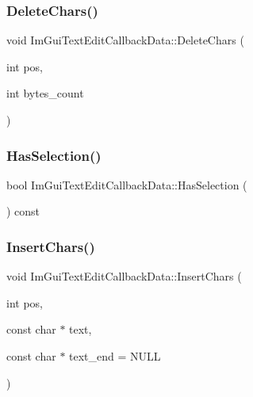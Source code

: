 \subsubsection{\texorpdfstring{Delete\+Chars()}{DeleteChars()}}
{\footnotesize\ttfamily void Im\+Gui\+Text\+Edit\+Callback\+Data\+::\+Delete\+Chars (\begin{DoxyParamCaption}\item[{int}]{pos,  }\item[{int}]{bytes\+\_\+count }\end{DoxyParamCaption})}

\hypertarget{struct_im_gui_text_edit_callback_data_ac43cc964e6c1c829db3fdb71660ff604}{}\label{struct_im_gui_text_edit_callback_data_ac43cc964e6c1c829db3fdb71660ff604} 
\subsubsection{\texorpdfstring{Has\+Selection()}{HasSelection()}}
{\footnotesize\ttfamily bool Im\+Gui\+Text\+Edit\+Callback\+Data\+::\+Has\+Selection (\begin{DoxyParamCaption}{ }\end{DoxyParamCaption}) const}

\hypertarget{struct_im_gui_text_edit_callback_data_a78aa927e57bf5fb898ba5a168e9bcf63}{}\label{struct_im_gui_text_edit_callback_data_a78aa927e57bf5fb898ba5a168e9bcf63} 
\subsubsection{\texorpdfstring{Insert\+Chars()}{InsertChars()}}
{\footnotesize\ttfamily void Im\+Gui\+Text\+Edit\+Callback\+Data\+::\+Insert\+Chars (\begin{DoxyParamCaption}\item[{int}]{pos,  }\item[{const char $\ast$}]{text,  }\item[{const char $\ast$}]{text\+\_\+end = {\ttfamily NULL} }\end{DoxyParamCaption})}



